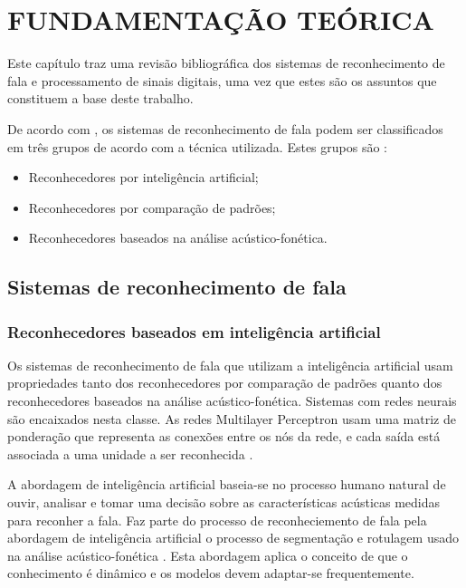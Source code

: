 \chapter{FUNDAMENTAÇÃO TEÓRICA}
\label{chap:referencial_teorico}
\thispagestyle{plain}
Este capítulo traz uma revisão bibliográfica dos sistemas de reconhecimento de fala e processamento de sinais digitais, uma vez que estes são os assuntos que constituem a base deste trabalho.

De acordo com \cite{fundRecFala}, os  sistemas de reconhecimento de fala podem ser classificados em três grupos de acordo com a técnica utilizada. Estes grupos são :
\begin{itemize}
\item Reconhecedores por inteligência artificial;
\item Reconhecedores por comparação de padrões;
\item Reconhecedores baseados na análise acústico-fonética.
\end{itemize}
\section{Sistemas de reconhecimento de fala }

\label{sec:sistemasdereconhecimentodefala}


\subsection{Reconhecedores baseados em inteligência artificial}

Os sistemas de reconhecimento de fala que utilizam a inteligência artificial usam propriedades tanto dos reconhecedores por comparação de padrões quanto dos reconhecedores baseados na análise acústico-fonética. Sistemas com redes neurais são encaixados nesta classe. As redes Multilayer Perceptron usam uma matriz de ponderação que representa as conexões entre os nós da rede, e cada saída está associada a uma unidade a ser reconhecida \cite{kluwerNeural}.

A abordagem de inteligência artificial  baseia-se no processo humano natural de ouvir, analisar e tomar uma decisão sobre as características acústicas medidas para reconher a fala. Faz parte do processo de reconheciemento de fala pela abordagem de inteligência artificial o processo de segmentação e rotulagem usado na análise acústico-fonética  \cite{fundRecFala}. Esta abordagem aplica o conceito de que o conhecimento é dinâmico  e os modelos devem adaptar-se frequentemente. 

